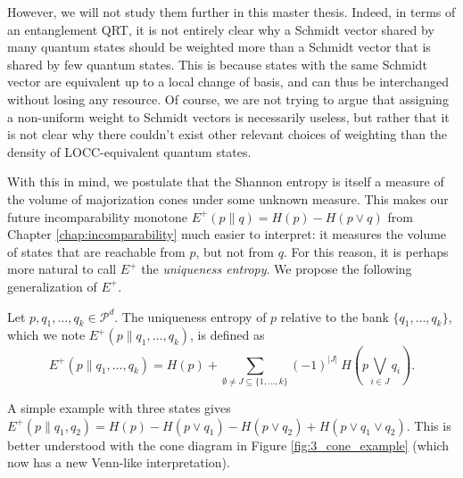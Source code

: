 However, we will not study them further in this master thesis. Indeed, in terms of an entanglement QRT, it is not entirely clear why a Schmidt vector shared by many quantum states should be weighted more than a Schmidt vector that is shared by few quantum states. This is because states with the same Schmidt vector are equivalent up to a local change of basis, and can thus be interchanged without losing any resource. Of course, we are not trying to argue that assigning a non-uniform weight to Schmidt vectors is necessarily useless, but rather that it is not clear why there couldn't exist other relevant choices of weighting than the density of LOCC-equivalent quantum states.

With this in mind, we postulate that the Shannon entropy is itself a measure of the volume of majorization cones under some unknown measure. This makes our future incomparability monotone $E^+(p \parallel q) = H(p) - H(p \vee q)$ from Chapter \ref{chap:incomparability} much easier to interpret: it measures the volume of states that are reachable from $p$, but not from $q$. For this reason, it is perhaps more natural to call $E^+$ the \textit{uniqueness entropy}. We propose the following generalization of $E^+$.

\begin{definition} \label{def:unique_entropy}
    Let $p, q_1, \dots, q_k \in \mathcal{P}^d$. The uniqueness entropy of $p$ relative to the bank $\{q_1, \dots, q_k\}$, which we note $E^+(p \parallel q_1, \dots, q_k)$, is defined as 
    \begin{equation} \label{eq:unique_entropy}
        E^+(p \parallel q_1, \dots, q_k) = H(p) + \sum_{\emptyset \neq J \subseteq \{1, \dots, k\}} (-1)^{|J|} \: H\left(p \bigvee\limits_{i \in J} q_i\right).
    \end{equation}
\end{definition}

A simple example with three states gives $E^+(p \parallel q_1, q_2) = H(p) - H(p \vee q_1) - H(p \vee q_2) + H(p \vee q_1 \vee q_2)$. This is better understood with the cone diagram in Figure \ref{fig:3_cone_example} (which now has a new Venn-like interpretation).

